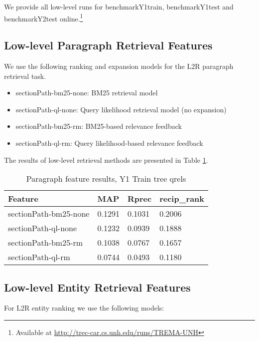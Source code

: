 \documentclass{article}
\begin{document}
We provide all low-level runs for benchmarkY1train, benchmarkY1test and benchmarkY2test online.\footnote{Available at \url{http://trec-car.cs.unh.edu/runs/TREMA-UNH}} 


\subsection{Low-level Paragraph Retrieval Features}\label{sec:para}

We  use the following ranking and expansion models for the L2R paragraph retrieval task.
\begin{itemize}
    \item sectionPath-bm25-none: BM25 retrieval model
    \item sectionPath-ql-none: Query likelihood retrieval model (no expansion)
    \item sectionPath-bm25-rm: BM25-based relevance feedback
    \item sectionPath-ql-rm: Query likelihood-based relevance feedback
\end{itemize}

The results of low-level retrieval methods are presented in Table \ref{tab:para}.

\begin{table}[tb]
\centering
\begin{tabular}{l l l l}
\hline
\textbf{Feature} & \textbf{MAP} & \textbf{Rprec} & \textbf{recip\_rank}\\
\hline
sectionPath-bm25-none & 0.1291 & 0.1031 & 0.2006 \\
sectionPath-ql-none & 0.1232 & 0.0939 & 0.1888 \\
sectionPath-bm25-rm & 0.1038 & 0.0767 & 0.1657 \\
sectionPath-ql-rm & 0.0744 & 0.0493 & 0.1180 \\
\hline
\end{tabular}
\caption{Paragraph feature results, Y1 Train tree qrels}\label{tab:para}
\end{table}

\subsection{Low-level Entity Retrieval Features}
\label{sec:entity}


For L2R entity ranking we use the following models:
\end{document}
